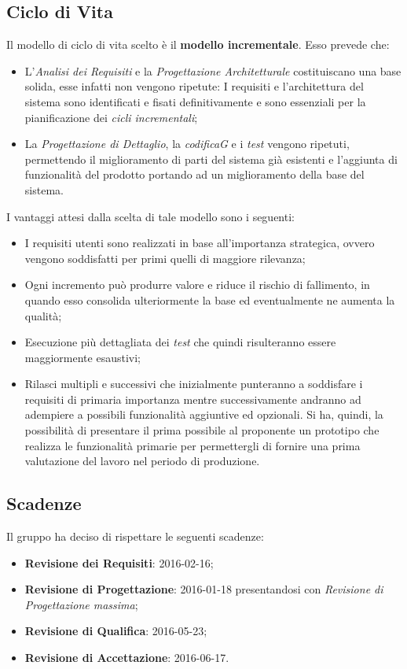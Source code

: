 \subsection{Ciclo di Vita}
Il modello di ciclo di vita scelto è il \textbf{modello incrementale}. Esso prevede che:
\begin{itemize}
	\item L'\textit{Analisi dei Requisiti} e la \textit{Progettazione Architetturale} costituiscano una base solida, esse infatti non vengono ripetute: I requisiti e l'architettura del sistema sono identificati e fisati definitivamente e sono essenziali per la pianificazione dei \textit{cicli incrementali};
	\item La \textit{Progettazione di Dettaglio}, la \textit{codifica{G}} e i \textit{test} vengono ripetuti, permettendo il miglioramento di parti del sistema già esistenti e l'aggiunta di funzionalità del prodotto portando ad un miglioramento della base del sistema.
\end{itemize}
I vantaggi attesi dalla scelta di tale modello sono i seguenti:
\begin{itemize}
	\item I requisiti utenti sono realizzati in base all'importanza strategica, ovvero vengono soddisfatti per primi quelli di maggiore rilevanza;
	\item Ogni incremento può produrre valore e riduce il rischio di fallimento, in quando esso consolida ulteriormente la base ed eventualmente ne aumenta la qualità;
	\item Esecuzione più dettagliata dei \textit{test} che quindi risulteranno essere maggiormente esaustivi;
	\item Rilasci multipli e successivi che inizialmente punteranno a soddisfare i requisiti di primaria importanza mentre successivamente andranno ad adempiere a possibili funzionalità aggiuntive ed opzionali. Si ha, quindi, la possibilità di presentare il prima possibile al proponente un prototipo che realizza le funzionalità primarie per permettergli di fornire una prima valutazione del lavoro nel periodo di produzione.
\end{itemize}
\subsection{Scadenze}
Il gruppo \textit{\gruppo} ha deciso di rispettare le seguenti scadenze:
\begin{itemize}
	\item \textbf{Revisione dei Requisiti}: 2016-02-16;
	\item \textbf{Revisione di Progettazione}: 2016-01-18 presentandosi con \textit{Revisione di Progettazione massima};
	\item \textbf{Revisione di Qualifica}: 2016-05-23;
	\item \textbf{Revisione di Accettazione}: 2016-06-17.
\end{itemize}
